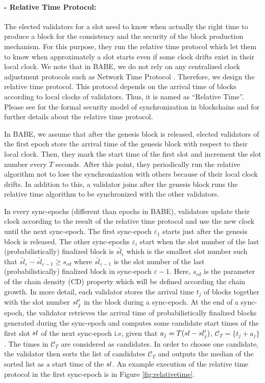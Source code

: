 


\paragraph{- Relative Time Protocol:}

The elected validators for a slot need to know  when actually the right time to produce a block for the consistency and the security of the block production mechanism. For this purpose, they run the relative time protocol which let them to know when approximately a slot starts even if some clock drifts exist in their local clock. We note that in BABE, we do not rely on any centralized clock adjustment protocols such as Network Time Protocol \cite{ntp}. Therefore, we design the relative time protocol. This protocol depends on the arrival time of blocks according to local clocks of validators. Thus, it is named as ``Relative Time''.
Please see \cite{consensusonclock} for the formal security model of synchronization in blockchains and for further details about the relative time protocol. 

In BABE, we assume that after the genesis block is released, elected validators of the first epoch store the arrival time of the genesis block with respect to their local clock. Then, they mark the start time of the first slot and increment the slot number every $ T $ seconds. After this point,  they periodically run the relative algorithm not to lose the synchronization with others because of their local clock drifts.  In addition to this, a validator joins after the genesis block runs the relative time algorithm to be synchronized with the other validators.

In every sync-epochs (different than epochs in BABE), validators update their clock according to the result of the relative time protocol and use the new clock until the next sync-epoch. The first sync-epoch $\varepsilon_1$ starts just after the genesis block is released. The other sync-epochs  $\varepsilon_i$ start when the slot number of the last (probabilistically) finalized block is $\bar{sl}_{\epsilon}$ which is the smallest slot number such that  $\bar{sl}_{\varepsilon} - \bar{sl}_{\varepsilon-1} \geq s_{cd}$ where $\bar{sl}_{\varepsilon-1}$ is the slot number of the last (probabilistically) finalized block in sync-epoch $\varepsilon-1$. Here, $s_{cd}$ is the parameter of the chain density (CD) property which will be defined according the chain growth.
In more detail, each validator  stores  the arrival time $ t_j $ of  blocks together with the slot number $sl'_j$ in the block during a sync-epoch. At the end of a sync-epoch, the validator retrieves the arrival time of probabilistically finalized blocks generated during the sync-epoch and computes some candidate start times of the first slot $ sl $ of the next sync-epoch i.e,  given that $ a_j = T(sl - sl'_j)  $,  $\mathcal{C}_T = \{t_j+a_j \}$. The times in $ \mathcal{C}_T $ are considered as candidates. In order to  choose one candidate,  the validator then sorts the list of candidates $ \mathcal{C}_T $ and outputs the median of the sorted list as a start time of the $ sl $. An example execution of the relative time protocol in the first sync-epoch is in Figure \ref{fig:relativetime}.


